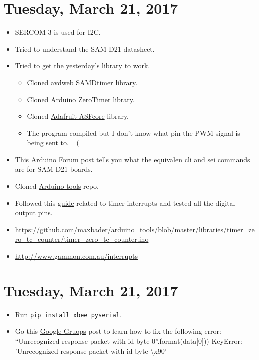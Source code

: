 \documentclass[12pt]{article}
\begin{document}
\section{Tuesday, March 21, 2017}
\begin{itemize}
\item SERCOM 3 is used for I2C.
\item Tried to understand the SAM D21 datasheet.
\item  Tried to get the yesterday's library to work.
	\begin{itemize}
	\item Cloned \href{https://github.com/avandalen/avdweb_SAMDtimer}{avdweb SAMDtimer} library.
	\item Cloned \href{https://github.com/adafruit/Adafruit_ZeroTimer}{Arduino ZeroTimer} library.
	\item Cloned \href{https://github.com/adafruit/Adafruit_ASFcore}{Adafruit ASFcore} library.
	\item The program compiled but I don't know what pin the PWM signal is being sent to. =(
	\end{itemize}
\item This \href{https://forum.arduino.cc/index.php?topic=457720.0}{Arduino Forum} post tells you what the equivalen \textsf{cli} and \textsf{sei} commands are for SAM D21 boards.
\item Cloned \href{https://github.com/maxbader/arduino_tools}{Arduino tools} repo.
\item Followed this \href{https://medium.com/@nebsp/smoothly-changing-a-timers-frequency-on-the-arduino-zero-1f6cd285369a#.xl6i5bu18}{guide} related to timer interrupts and tested all the digital output pins.
\item \url{https://github.com/maxbader/arduino_tools/blob/master/libraries/timer_zero_tc_counter/timer_zero_tc_counter.ino}
\item \url{http://www.gammon.com.au/interrupts}
\end{itemize}

\section{Tuesday, March 21, 2017}
\begin{itemize}
\item Run \texttt{pip install xbee pyserial}.
\item Go this \href{https://groups.google.com/forum/#!topic/python-xbee/jdyQ5ev9_vg}{Google Gruops} post to learn how to fix the following error: \textsf{``Unrecognized response packet with id byte {0}''.format(data[0]))
KeyError: 'Unrecognized response packet with id byte \textbackslash x90'}
\end{itemize}
\end{document}
